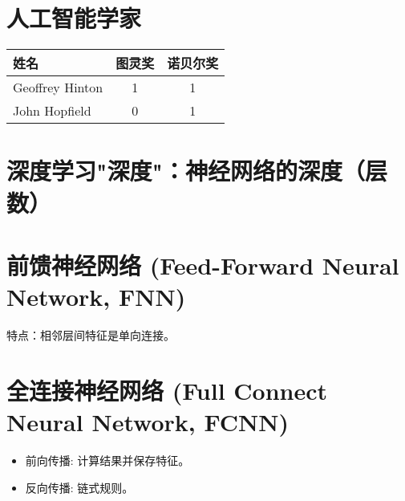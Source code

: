 \documentclass[
12pt, %
a4paper, 
oneside, %
headinclude,footinclude, %
]{scrartcl}
\title{\normalfont\spacedallcaps{深度学习}}
\date{}
\begin{document}
\maketitle
\newpage
\hypertarget{toc}{}
\tableofcontents 
\newpage
\listoffigures
\listoftables
\listoftips
\newpage
\section{人工智能学家}
\begin{table}[h]
    \centering
    \begin{tabular}{|l|c|c|}
        \hline
        姓名 & 图灵奖 & 诺贝尔奖 \\
        \hline
        Geoffrey Hinton & 1 & 1 \\
        \hline
        John Hopfield & 0 & 1 \\
        \hline
    \end{tabular}
\end{table}

\section{深度学习"深度"：神经网络的深度（层数）}

\section{前馈神经网络 (Feed-Forward Neural Network, FNN)}
特点：相邻层间特征是单向连接。

\section{全连接神经网络 (Full Connect Neural Network, FCNN)}
\begin{itemize}
    \item 前向传播: 计算结果并保存特征。
    \item 反向传播: 链式规则。
\end{itemize}
\end{document}
